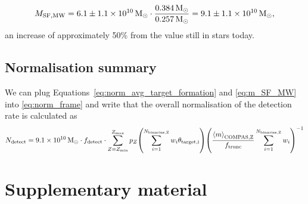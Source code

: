 \begin{equation}
    M_{\rm SF, MW} = 6.1 \pm 1.1 \times 10^{10} \unit{M_{\odot}} \cdot \frac{0.384 \unit{M_{\odot}}}{0.257 \unit{M_{\odot}}} = 9.1 \pm 1.1 \times 10^{10} \unit{M_{\odot}},
\end{equation}
an increase of approximately 50\% from the value still in stars today.

\subsection{Normalisation summary}
We can plug Equations~\ref{eq:norm_avg_target_formation} and \ref{eq:m_SF_MW} into \ref{eq:norm_frame} and write that the overall normalisation of the detection rate is calculated as
\begin{equation}
    N_{\rm detect} = 9.1 \times 10^{10} \unit{M_{\odot}} \cdot f_{\rm detect} \cdot \sum_{Z=Z_{\rm min}}^{Z_{\rm max}} p_{Z} \qty(\sum_{i=1}^{N_{\rm binaries, Z}} w_i \theta_{\rm target, i}) \qty(\frac{\avg{m}_{\rm COMPAS, Z}}{f_{\rm trunc}} \sum_{i=1}^{N_{\rm binaries, Z}} w_i)^{-1}
\end{equation}

\section{Supplementary material}

